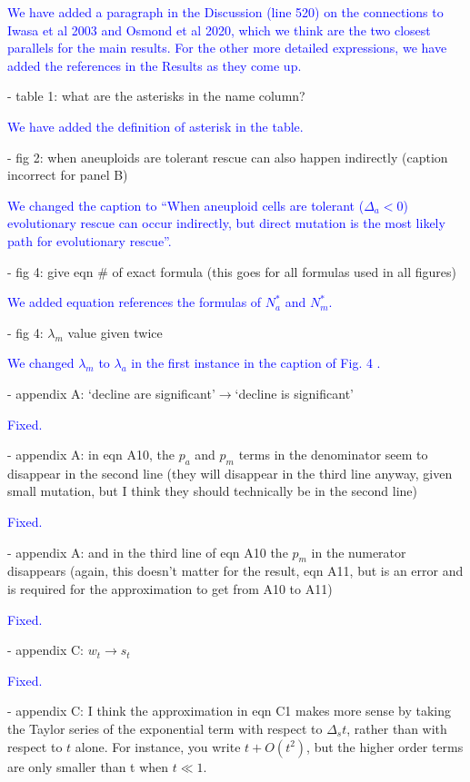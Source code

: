 \documentclass[12pt]{extarticle}
\begin{document}
\textcolor{blue}{We have added a paragraph in the Discussion (line 520) on the connections to Iwasa et al 2003 and Osmond et al 2020, which we think are the two closest parallels for the main results. 
For the other more detailed expressions, we have added the references in the Results as they come up.} 

- table 1: what are the asterisks in the name column?

\textcolor{blue}{%
We have added the definition of asterisk in the table.
} 

- fig 2: when aneuploids are tolerant rescue can also happen indirectly (caption incorrect for panel B)

\textcolor{blue}{%
We changed the caption to ``When aneuploid cells are tolerant ($\Delta_a<0$) evolutionary rescue can occur indirectly, but direct mutation is the most likely path for evolutionary rescue''.
} 

- fig 4: give eqn $\#$ of exact formula (this goes for all formulas used in all figures)

\textcolor{blue}{%
We added equation references the formulas of $N_a^*$ and $N_m^*$.
} 

- fig 4: $\lambda_m$ value given twice

\textcolor{blue}{%
We changed $\lambda_m$ to $\lambda_a$ in the first instance in the caption of Fig. 4 .
} 

- appendix A: `decline are significant'$\rightarrow$`decline is significant'

\textcolor{blue}{Fixed.}  %

- appendix A: in eqn A10, the $p_a$ and $p_m$ terms in the denominator seem to disappear in the second line (they will disappear in the third line anyway, given small mutation, but I think they should technically be in the second line)

\textcolor{blue}{Fixed.} %

- appendix A: and in the third line of eqn A10 the $p_m$ in the numerator disappears (again, this doesn't matter for the result, eqn A11, but is an error and is required for the approximation to get from A10 to A11)

\textcolor{blue}{Fixed.} %

- appendix C: $w_t\rightarrow s_t$

\textcolor{blue}{Fixed.} %

- appendix C: I think the approximation in eqn C1 makes more sense by taking the Taylor series of the exponential term with respect to $\Delta_st$, rather than with respect to $t$ alone. For instance, you write $t + O(t^2)$, but the higher order terms are only smaller than t when $t\ll1$.
\end{document}

